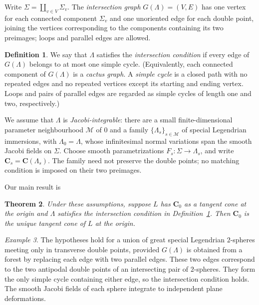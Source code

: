 \documentclass[11pt,a4paper]{article}
\numberwithin{equation}{section}
\newtheorem{theorem}{Theorem}[section]
\theoremstyle{definition}
\newtheorem{definition}[theorem]{Definition}
\theoremstyle{remark}
\newtheorem{example}[theorem]{Example}
\begin{document}
	Write $\Sigma=\coprod_{v\in V}\Sigma_v$. The \emph{intersection graph}
	$G(\Lambda)=(V,E)$ has one vertex for each connected component $\Sigma_v$
	and one unoriented edge for each double point, joining the vertices
	corresponding to the components containing its two preimages; loops and
	parallel edges are allowed.
	
	\begin{definition}\label{def:graph-condition}
		We say that $\Lambda$ satisfies the \emph{intersection condition} if every edge
		of $G(\Lambda)$ belongs to at most one simple cycle.
		(Equivalently, each connected component of $G(\Lambda)$ is a \emph{cactus graph}.
		A \emph{simple cycle} is a closed path with no repeated edges and no repeated
		vertices except its starting and ending vertex.
		Loops and pairs of parallel edges are regarded as simple cycles of length one
		and two, respectively.)
	\end{definition}
	
	We assume that $\Lambda$ is \emph{Jacobi-integrable}:
	there are a small finite-dimensional parameter neighbourhood $\mathcal M$
	of $0$ and a family $\{\Lambda_s\}_{s\in\mathcal M}$ of special
	Legendrian immersions, with $\Lambda_0=\Lambda$, whose infinitesimal normal
	variations span the smooth Jacobi fields on $\Sigma$. Choose smooth
	parametrizations $F_s:\Sigma\to\Lambda_s$, and write
	$\mathbf C_s=\mathbf C(\Lambda_s)$. The family need not preserve the
	double points; no matching condition is imposed on their two preimages.
	
	Our main result is

	\begin{theorem}\label{thm:target}
		Under these assumptions, suppose $L$ has $\mathbf C_0$ as a tangent cone
		at the origin and $\Lambda$ satisfies the intersection condition in
		Definition~\ref{def:graph-condition}. Then $\mathbf C_0$ is the unique tangent
		cone of $L$ at the origin.
	\end{theorem}

	
	\begin{example}\label{ex:tree}
		The hypotheses hold for a union of great special Legendrian $2$-spheres
		meeting only in transverse double points, provided $G(\Lambda)$ is
		obtained from a forest by replacing each edge with two parallel edges.
		These two edges correspond to the two antipodal double points of an
		intersecting pair of $2$-spheres. They form the only simple cycle
		containing either edge, so the intersection condition holds.
		The smooth Jacobi fields of each sphere integrate to independent plane
		deformations.
	\end{example}
	
\end{document}
